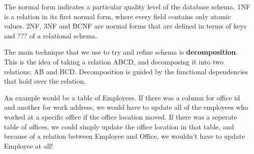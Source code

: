 
The normal form indicates a particular quality level of the database schema. 1NF
is a relation in its first normal form, where every field contains only atomic
values. 2NF, 3NF and BCNF are normal forms that are defined in terms of keys and
??? of a relational schema.

The main technique that we use to try and refine schema is
\textbf{decomposition}. This is the idea of taking a relation ABCD, and
decomposing it into two relations; AB and BCD. Decomposition is guided by the
functional dependencies that hold over the relation.

An example would be a table of Employees. If there was a column for office id
and another for work address, we would have to update all of the employees who
worked at a specific office if the office location moved. If there was a
seperate table of offices, we could simply update the office location in that
table, and because of a relation between Employee and Office, we wouldn't have
to update Employee at all!
